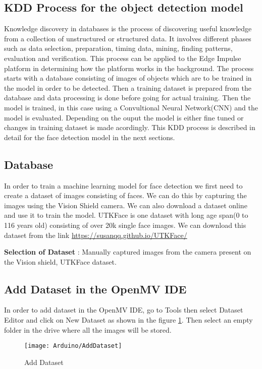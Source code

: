 \subsection{KDD Process for the object detection model}
Knowledge discovery in databases is the process of discovering useful knowledge from
a collection of unstructured or structured data. It involves different phases such as data selection,
preparation, timing data, mining, finding patterns, evaluation and verification. This process can be applied to the Edge Impulse platform in determining how the platform works in the background.
The process starts with a database consisting of images of objects which are to be trained in the model in order to be detected. Then a training dataset is prepared from the database and data processing is done before going for actual training. Then  the model is  trained, in this case using a Convultional Neural Network(CNN)  and the model is evaluated. Depending on the ouput the model is either fine tuned or changes in training dataset is made acordingly. This KDD process is described in detail for the face detection  model in the next sections.

\subsection{Database}
In order to train a machine learning model for face detection we first need to create a dataset of images consisting of faces.  We can do this by capturing the images using the Vision Shield camera. We can also download a dataset online and use it to train the model.  UTKFace  is one dataset with long age span(0 to 116 years old) consisting of over 20k single face images. We can download this dataset from the link \url{https://susanqq.github.io/UTKFace/}

\textbf{Selection of Dataset} : Manually captured images from the camera present on the Vision shield, UTKFace dataset.
\vspace{-1em}
\subsection{Add Dataset in the OpenMV IDE}
In order to add dataset in the OpenMV IDE, go to Tools then select Dataset Editor and click on New Dataset as shown in the figure \ref{figure 9.1}. Then select an empty folder in the drive where all the images will be stored. 

\begin{figure}
	\centering
	\texttt{[image: Arduino/AddDataset]}
	\caption{Add Dataset}
	\label{figure 9.1}
\end{figure}

